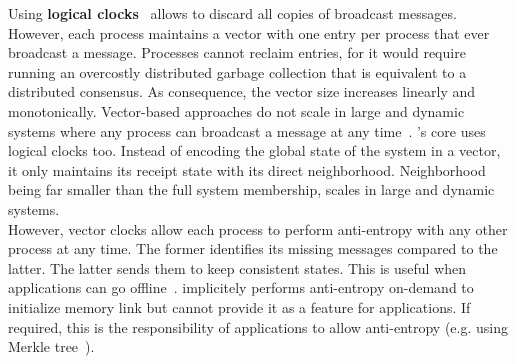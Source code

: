 Using \textbf{logical clocks}~\cite{malkhi2007concise,mukund2014optimized}
allows to discard all copies of broadcast messages. However, each process
maintains a vector with one entry per process that ever broadcast a message.
Processes cannot reclaim entries, for it would require running an overcostly
distributed garbage collection that is equivalent to a distributed consensus. As
consequence, the vector size increases linearly and monotonically. Vector-based
approaches do not scale in large and dynamic systems where any process can
broadcast a message at any time~\cite{nedelec2016crate}. \RPCBROADCAST's core
uses logical clocks too. Instead of encoding the global state of the system in a
vector, it only maintains its receipt state with its direct
neighborhood. Neighborhood being far smaller than the full system membership,
\RPCBROADCAST scales in large and dynamic systems. \\
However, vector clocks allow each process to perform anti-entropy with any other
process at any time. The former identifies its missing messages compared to the
latter.  The latter sends them to keep consistent states. This is useful when
applications can go offline~\cite{demers1987epidemic}. \RPCBROADCAST implicitely
performs anti-entropy on-demand to initialize memory link but cannot provide it
as a feature for applications. If required, this is the responsibility of
applications to allow anti-entropy (e.g. using Merkle
tree~\cite{merkle1988digital}).

